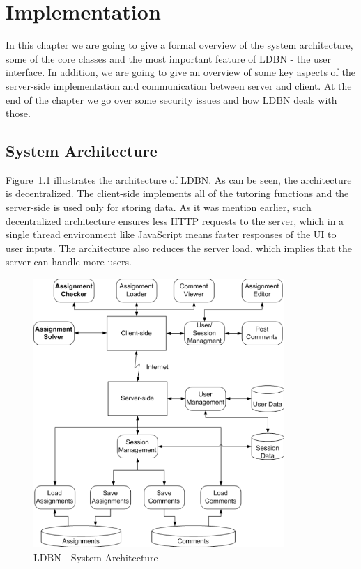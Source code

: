 \chapter{Implementation}
\label{chap:impl}
In this chapter we are going to give a formal overview of the system architecture,
some of the core classes and the most important
feature of LDBN - the user interface. In addition, we are going to give an overview
of some key aspects of the server-side implementation and communication
between server and client. At the end of the chapter we go over some
security issues and how LDBN deals with those. 

\section{System Architecture}
Figure~\ref{fig:sysarch} illustrates the architecture of LDBN. 
As can be seen, the architecture is decentralized. The client-side implements 
all of the tutoring functions and the server-side is used only for storing data.
As it was mention earlier, such decentralized architecture ensures less HTTP requests to
the server, which in a single thread environment like JavaScript means faster 
responses of the UI to user inputs. The architecture also reduces the server load,
which implies that the server can handle more users.

\begin{figure}[h]
	\begin{center}
		\includegraphics[width=0.85\textwidth]{./img/architecture01a.png}
		\caption{LDBN - System Architecture}
		\label{fig:sysarch}
	\end{center}
\end{figure}

